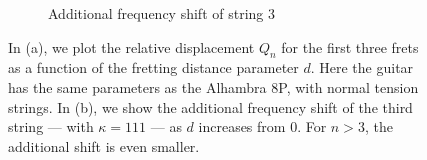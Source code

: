 \begin{figure}
\begin{subfigure}[b]{0.8\textwidth}
   \caption{Additional frequency shift of string 3}
   \label{fig:fret_shift}
  \end{subfigure}
  \caption{\label{fig:fret_model} In (a), we plot the relative displacement $Q_n$ for the first three frets as a function of the fretting distance parameter $d$. Here the guitar has the same parameters as the Alhambra 8P, with normal tension strings. In (b), we show the additional frequency shift of the third string --- with $\kappa = 111$ --- as $d$ increases from 0. For $n > 3$, the additional shift is even smaller.}
 \end{figure}
